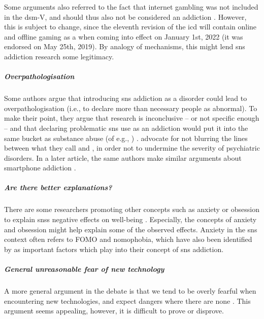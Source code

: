 Some arguments also referred to the fact that internet gambling was not included in the \gls{dsm}-V, and should thus also not be considered an addiction \citep{rosen_smart_2019}. 
However, this is subject to change, since the eleventh revision of the \gls{icd} will contain online and offline gaming as a  \citep{who_icd-11_2019} when coming into effect on January 1st, 2022 (it was endorsed on May 25th, 2019).
By analogy of mechanisms, \citep{kuss_social_2017, ryding_internet_2018} this might lend \gls{sns} addiction research some legitimacy.

\subparagraph{Overpathologisation} Some authors argue that introducing \gls{sns} addiction as a disorder could lead to overpathologisation (i.e., to declare more than necessary people as abnormal). 
To make their point, they argue that research is inconclusive -- or not specific enough -- \citep{howard_analysis_2015, vuorre_there_2021,robertson_why_2021} 
and that declaring problematic \gls{sns} use as an addiction would put it into the same bucket as substance abuse (of e.g.,  \citep{carbonell_critical_2017}) \citep{john_too_2021, rosen_smart_2019}.
\citet{carbonell_critical_2017} advocate for not blurring the lines between what they call  and , in order not to undermine the severity of psychiatric disorders. 
In a later article, the same authors make similar arguments about smartphone addiction \citep{panova_is_2018}.

\subparagraph{Are there better explanations?}
There are some researchers promoting other concepts such as anxiety or obsession to explain \gls{sns}s negative effects on well-being \citep{bragazzi_proposal_2014, buglass_motivators_2017, oberst_negative_2017, rosen_obsessiveaddictive_2018, panova_specific_2020}. 
Especially, the concepts of anxiety and obsession might help explain some of the observed effects.
Anxiety in the \gls{sns} context often refers to FOMO and nomophobia, which have also been identified by \citep{kuss_social_2017} as important factors which play into their concept of \gls{sns} addiction.

\subparagraph{General unreasonable fear of new technology} 
A more general argument in the debate is that we tend to be overly fearful when encountering new technologies, and expect dangers where there are none \citep{ryding_internet_2018, orben_sisyphean_2020}. 
This argument seems appealing, however, it is difficult to prove or disprove.


